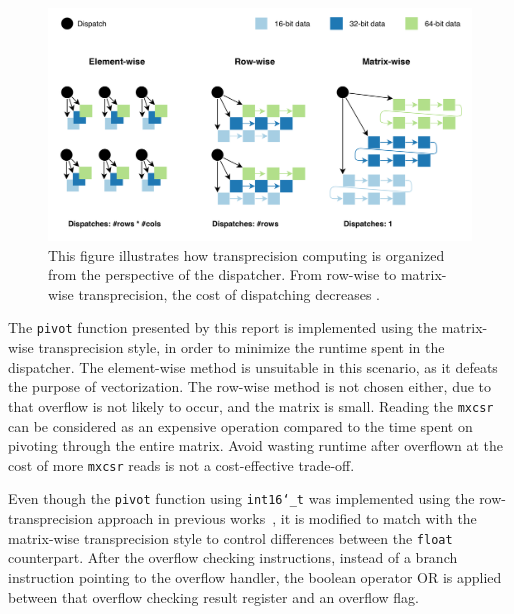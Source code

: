 \documentclass[logo,bsc,singlespacing,parskip]{infthesis}
\newcommand{\dtshort}{\texttt{int16\char`_t}}
\newcommand{\dtfloat}{\texttt{float}}
\newcommand{\mxcsr}{\texttt{mxcsr}}
\newcommand{\pivot}{\texttt{pivot}}
\begin{document}
\begin{figure}[H]
\begin{center}
    \includegraphics[width=\linewidth]{image/transprecision-dispatch.png}
    \caption{This figure illustrates how transprecision computing is organized
    from the perspective of the dispatcher. From row-wise to matrix-wise 
    transprecision, the cost of dispatching decreases \cite{FPL1}.}
    \label{fig:transprecision-dispatch}
\end{center}
\end{figure}

The \pivot{} function presented by this report is implemented using the
matrix-wise transprecision style, in order to minimize the runtime spent in the
dispatcher. The element-wise method is unsuitable in this scenario, as it
defeats the purpose of vectorization. The row-wise method is not chosen either,
due to that overflow is not likely to occur, and the matrix is small. Reading
the \mxcsr{} can be considered as an expensive operation compared to the time
spent on pivoting through the entire matrix. Avoid wasting runtime after
overflown at the cost of more \mxcsr{} reads is not a cost-effective
trade-off.

Even though the \pivot{} function using \dtshort{} was implemented using the
row-transprecision approach in previous works~\cite{FPL2}, it is modified to
match with the matrix-wise transprecision style to control differences
between the \dtfloat{} counterpart. After the overflow checking instructions,
instead of a branch instruction pointing to the overflow handler, the boolean
operator OR is applied between that overflow checking result register and an
overflow flag. 
\end{document}
